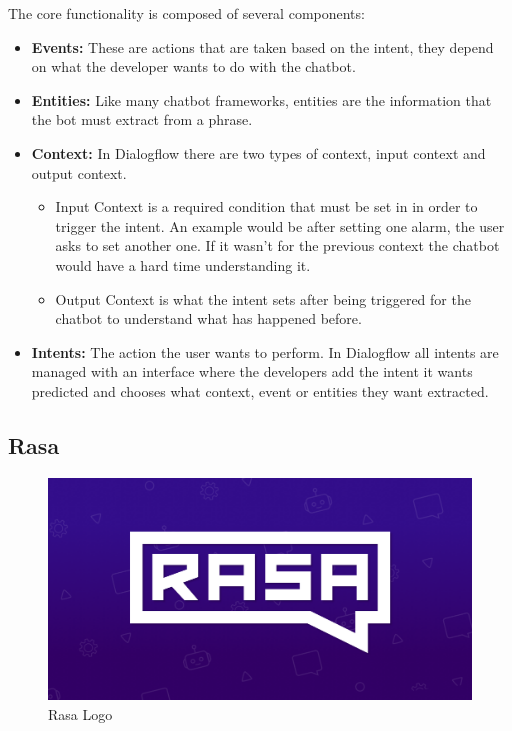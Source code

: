 The core functionality is composed of several components:\\
\begin{itemize}
	\item {\textbf{Events:} These are actions that are taken based on the intent, they depend on what the developer wants to do with the chatbot.}
	\item {\textbf{Entities:} Like many chatbot frameworks, entities are the information that the bot must extract from a phrase.}
	\item {\textbf{Context:} In Dialogflow there are two types of context, input context and output context.\\
			\begin{itemize}
				\item {Input Context is a required condition that must be set in in order to trigger the intent. An example would be after setting one alarm, the user asks to set another one. If it wasn’t for the previous context the chatbot would have a hard time understanding it.}
				\item {Output Context is what the intent sets after being triggered for the chatbot to understand what has happened before.}
			\end{itemize}
			}
	\item {\textbf{Intents:} The action the user wants to perform. In Dialogflow all intents are managed with an interface where the developers add the intent it wants predicted and chooses what context, event or entities they want extracted.}
\end{itemize}

\clearpage

\subsection{Rasa}\label{sec:chap3_rasa}

\begin{center}
	\begin{figure}[h!]
		\centering
		\includegraphics[scale=0.3]{./images/3-rasa-log}
		\caption{Rasa Logo}
		\label{rasa_logo}
	\end{figure}
\end{center}

